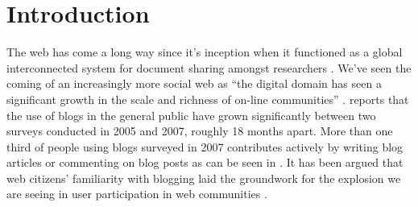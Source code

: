 \chapter{Introduction}

%
%

The web has come a long way since it's inception when it functioned as a
global interconnected system for document sharing amongst researchers
\citep[p.~82]{bernerslee92}. We've
seen the coming of an increasingly more social web as
``the digital domain has seen a significant growth in the scale and richness
of on-line communities'' \citep[p.~44]{backstrom06}.
\citet[ch.~1, p.~2]{rosa07} reports that the
use of blogs in the general public%
have grown significantly between two surveys conducted in 2005 and 2007,
roughly 18 months apart.
More than one third of people using blogs surveyed in 2007 contributes
actively by writing blog articles or commenting on blog posts as can be seen in
\citep[ch.~1, p.~6]{rosa07}.
It has been argued that web citizens'
familiarity with blogging laid the groundwork for the explosion we are seeing
in user participation in web communities \citep{weiss05,beer07}.

